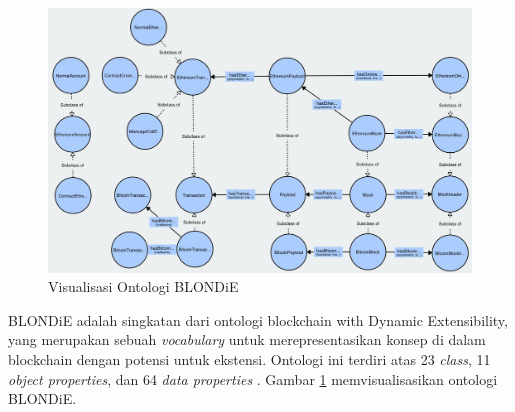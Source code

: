 \begin{figure}[ht]
	\centering
	\includegraphics[width=1\textwidth]{resources/chapter-2/blondie-visualization.jpg}
	\caption{Visualisasi Ontologi BLONDiE \parencite{third2017linked}}
	\label{image:blondie-visualization}
\end{figure}

BLONDiE adalah singkatan dari ontologi blockchain with Dynamic Extensibility, yang merupakan sebuah \textit{vocabulary} untuk merepresentasikan konsep di dalam blockchain dengan potensi untuk ekstensi. Ontologi ini terdiri atas 23 \textit{class}, 11 \textit{object properties}, dan 64 \textit{data properties} \parencite{hector2020blondie}. Gambar \ref{image:blondie-visualization} memvisualisasikan ontologi BLONDiE.
